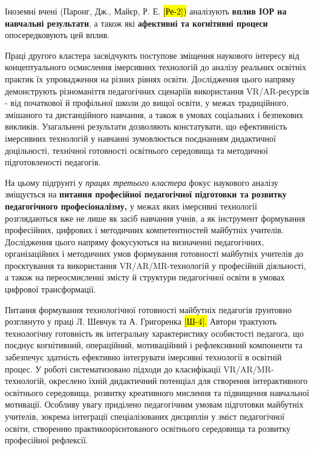 Іноземні вчені (Паронг, Дж., Майєр, Р. Е. \hl{{[}Ре-2{]})} аналізують \textbf{вплив ІОР на навчальні результати}, а також які \textbf{афективні та когнітивні процеси} опосередковують цей вплив.

Праці другого кластера засвідчують поступове зміщення наукового інтересу від концептуального осмислення імерсивних технологій до аналізу реальних освітніх практик їх упровадження на різних рівнях освіти. Дослідження цього напряму демонструють різноманіття педагогічних сценаріїв використання VR/AR-ресурсів - від початкової й профільної школи до вищої освіти, у межах традиційного, змішаного та дистанційного навчання, а також в умовах соціальних і безпекових викликів. Узагальнені результати дозволяють констатувати, що ефективність імерсивних технологій у навчанні зумовлюється поєднанням дидактичної доцільності, технічної готовності освітнього середовища та методичної підготовленості педагогів.

На цьому підґрунті у \emph{працях третього кластера} фокус наукового аналізу зміщується на \textbf{питання професійної педагогічної підготовки та розвитку педагогічного професіоналізму,} у межах яких імерсивні технології розглядаються вже не лише як засіб навчання учнів, а як інструмент формування професійних, цифрових і методичних компетентностей майбутніх учителів. Дослідження цього напряму фокусуються на визначенні педагогічних, організаційних і методичних умов формування готовності майбутніх учителів до проєктування та використання VR/AR/MR-технологій у професійній діяльності, а також на переосмисленні змісту й структури педагогічної освіти в умовах цифрової трансформації.

Питання формування технологічної готовності майбутніх педагогів ґрунтовно розглянуто у праці Л. Шевчук та А. Григоренка \hl{{[}Ш-4{]}.} Автори трактують технологічну готовність як інтегральну характеристику особистості педагога, що поєднує когнітивний, операційний, мотиваційний і рефлексивний компоненти та забезпечує здатність ефективно інтегрувати імерсивні технології в освітній процес. У роботі систематизовано підходи до класифікації VR/AR/MR-технологій, окреслено їхній дидактичний потенціал для створення інтерактивного освітнього середовища, розвитку креативного мислення та підвищення навчальної мотивації. Особливу увагу приділено педагогічним умовам підготовки майбутніх учителів, зокрема інтеграції спеціалізованих дисциплін у зміст педагогічної освіти, створенню практикоорієнтованого освітнього середовища та розвитку професійної рефлексії.

